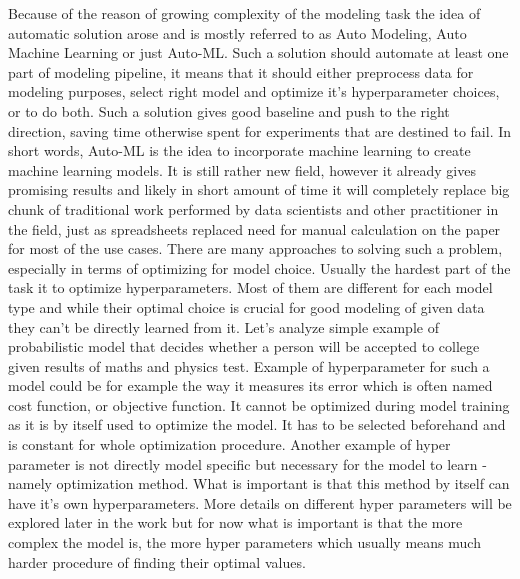 \documentclass[a4paper,twoside,12pt]{book}
\begin{document}
\begin{itemize}
Because of the reason of growing complexity of the modeling task the idea of automatic solution arose and is mostly referred to as Auto Modeling, Auto Machine Learning or just Auto-ML. Such a solution should automate at least one part of modeling pipeline, it means that it should either preprocess data for modeling purposes, select right model and optimize it's hyperparameter choices, or to do both.
Such a solution gives good baseline and push to the right direction, saving time otherwise spent for experiments that are destined to fail. In short words, Auto-ML is the idea to incorporate machine learning to create machine learning models. It is still rather new field, however it already gives promising results and likely in short amount of time it will completely replace big chunk of traditional work performed by data scientists and other practitioner in the field, just as spreadsheets replaced need for manual calculation on the paper for most of the use cases.
\newline
There are many approaches to solving such a problem, especially in terms of optimizing for model choice. 
Usually the hardest part of the task it to optimize hyperparameters. Most of them are different for each model type and while their optimal choice is crucial for good modeling of given data they can't be directly learned from it. Let's analyze simple example of probabilistic model that decides whether a person will be accepted to college given results of maths and physics test. Example of hyperparameter for such a model could be for example the way it measures its error which is often named cost function, or objective function. It cannot be optimized during model training as it is by itself used to optimize the model. It has to be selected beforehand and is constant for whole optimization procedure.
Another example of hyper parameter is not directly model specific but necessary for the model to learn - namely optimization method. What is important is that this method by itself can have it's own hyperparameters. More details on different hyper parameters will be explored later in the work but for now what is important is that the more complex the model is, the more hyper parameters which usually means much harder procedure of finding their optimal values.
\newline

\end{itemize}
\end{document}
